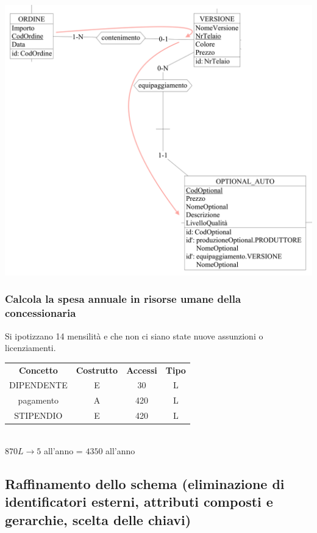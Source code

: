 \documentclass[11pt]{article}
\begin{document}
\begin{center}
    \includegraphics[width=\linewidth]{images/navigationSchemes/calcolaOrdine.png}
\end{center}

\subsubsection{Calcola la spesa annuale in risorse umane della concessionaria}

Si ipotizzano 14 mensilità e che non ci siano state nuove assunzioni o licenziamenti.

\begin{table}[H]
    \centering
    \begin{tabular}{c c c c}
        \rowcolor{red!20!}
        \textbf{Concetto} & \textbf{Costrutto} & \textbf{Accessi} &
        \textbf{Tipo}\\
        DIPENDENTE & E & 30 & L \\
        pagamento & A & 420 & L \\
        STIPENDIO & E & 420 & L \\
    \end{tabular}\\
    \( 870L \rightarrow 5 \) all'anno = \( 4350 \) all'anno
\end{table}

\subsection{Raffinamento dello schema (eliminazione di identificatori esterni,
attributi composti e gerarchie, scelta delle chiavi)}
\end{document}
